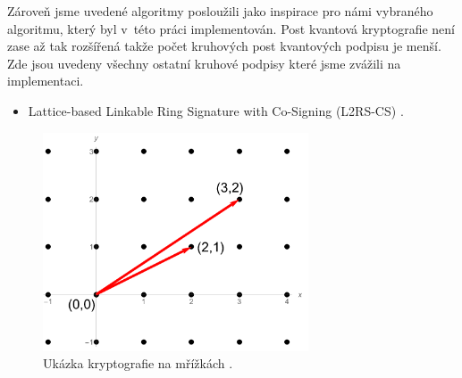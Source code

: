 \hfill

Zároveň jsme uvedené algoritmy posloužili jako inspirace pro námi vybraného algoritmu, který byl v~této práci implementován. Post kvantová kryptografie není zase až tak rozšířená takže počet kruhových post kvantových podpisu je menší. Zde jsou uvedeny všechny ostatní kruhové podpisy které jsme zvážili na implementaci.

\begin{itemize}
  \item Lattice-based Linkable Ring Signature with Co-Signing (L2RS-CS) \cite{Torres2020}.
\end{itemize}


\begin{figure}[htbp]
  \centering
  \includegraphics[width=0.7\textwidth]{img/mrizky.png}
  \caption{Ukázka kryptografie na mřížkách \cite{Mrizky picture}.}
  \label{lattice}
  \label{Ring signature}
\end{figure}